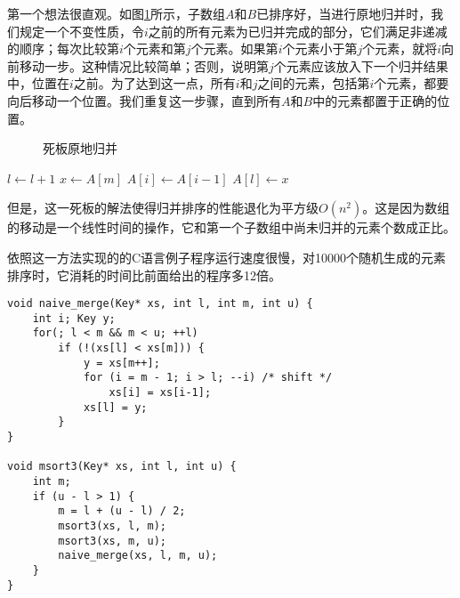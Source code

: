 \documentclass{ctexart}
\begin{document}
第一个想法很直观。如图\ref{fig:merge-in-place-naive}所示，子数组$A$和$B$已排序好，当进行原地归并时，我们规定一个不变性质，令$i$之前的所有元素为已归并完成的部分，它们满足非递减的顺序；每次比较第$i$个元素和第$j$个元素。如果第$i$个元素小于第$j$个元素，就将$i$向前移动一步。这种情况比较简单；否则，说明第$j$个元素应该放入下一个归并结果中，位置在$i$之前。为了达到这一点，所有$i$和$j$之间的元素，包括第$i$个元素，都要向后移动一个位置。我们重复这一步骤，直到所有$A$和$B$中的元素都置于正确的位置。

\begin{figure}[htbp]
 \centering
 \caption{死板原地归并}
 \label{fig:merge-in-place-naive}
\end{figure}

\begin{algorithmic}[1]
      \State $l \gets l + 1$
    \Else
      \State $x \gets A[m]$
       
        \State $A[i] \gets A[i-1]$
      \EndFor
      \State $A[l] \gets x$
    \EndIf
  \EndWhile
\EndProcedure
\end{algorithmic}

但是，这一死板的解法使得归并排序的性能退化为平方级$O(n^2)$。这是因为数组的移动是一个线性时间的操作，它和第一个子数组中尚未归并的元素个数成正比。

依照这一方法实现的的C语言例子程序运行速度很慢，对10000个随机生成的元素排序时，它消耗的时间比前面给出的程序多12倍。

\lstset{language=C}
\begin{lstlisting}
void naive_merge(Key* xs, int l, int m, int u) {
    int i; Key y;
    for(; l < m && m < u; ++l)
        if (!(xs[l] < xs[m])) {
            y = xs[m++];
            for (i = m - 1; i > l; --i) /* shift */
                xs[i] = xs[i-1];
            xs[l] = y;
        }
}

void msort3(Key* xs, int l, int u) {
    int m;
    if (u - l > 1) {
        m = l + (u - l) / 2;
        msort3(xs, l, m);
        msort3(xs, m, u);
        naive_merge(xs, l, m, u);
    }
}
\end{lstlisting}
\end{document}
